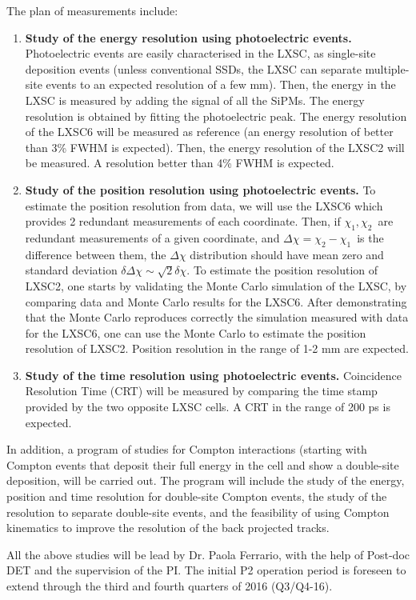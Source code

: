 The plan of measurements include:
\begin{enumerate}
\item {\bf Study of the energy resolution using photoelectric events.} Photoelectric events are easily characterised in the LXSC, as single-site deposition events (unless conventional SSDs, the LXSC can separate multiple-site events to an expected resolution of a few mm). Then, the energy in the LXSC is measured by adding the signal of all the SiPMs. The energy resolution is obtained by fitting the photoelectric peak. The energy resolution of the LXSC6 will be measured as reference (an energy resolution of better than 3\% FWHM is expected). Then, the energy resolution of the LXSC2 will be measured. A resolution better than 4\% FWHM is expected.
\item {\bf Study of the position resolution using photoelectric events.} To estimate the position resolution from data, we will use the LXSC6 which provides 2 redundant measurements of each coordinate. Then, if $\chi_1,\chi_2$~are redundant measurements of a given coordinate, and $\Delta \chi = \chi_2 - \chi_1$~is the difference between them, the $\Delta \chi$ distribution should have mean zero and standard deviation  
$\delta \Delta \chi \sim \sqrt{2} \delta \chi$. To estimate the position resolution of LXSC2, one starts by validating the Monte Carlo simulation of the LXSC, by comparing data and Monte Carlo results for the LXSC6. After demonstrating that the Monte Carlo reproduces correctly the simulation measured with data for the LXSC6, one can use the Monte Carlo to estimate the position resolution of LXSC2. Position resolution in the range of 1-2 mm are expected. 
\item {\bf Study of the time resolution using photoelectric events.} Coincidence Resolution Time (CRT) will be measured by comparing the time stamp provided by the two opposite LXSC cells. A CRT in the range of 200 ps is expected.
\end{enumerate}

In addition, a program of studies for Compton interactions (starting with Compton events that deposit their full energy in the cell and show a double-site deposition, will be carried out. The program will include the study of the energy, position and time resolution for double-site Compton events, the study of the resolution to separate double-site events, and the feasibility of using Compton kinematics to improve the resolution of the back projected tracks. 

All the above studies will be lead by Dr. Paola Ferrario, with the help of Post-doc DET and the supervision of the PI. The initial P2 operation period is foreseen to extend through the third and fourth quarters of 2016 (Q3/Q4-16). 

